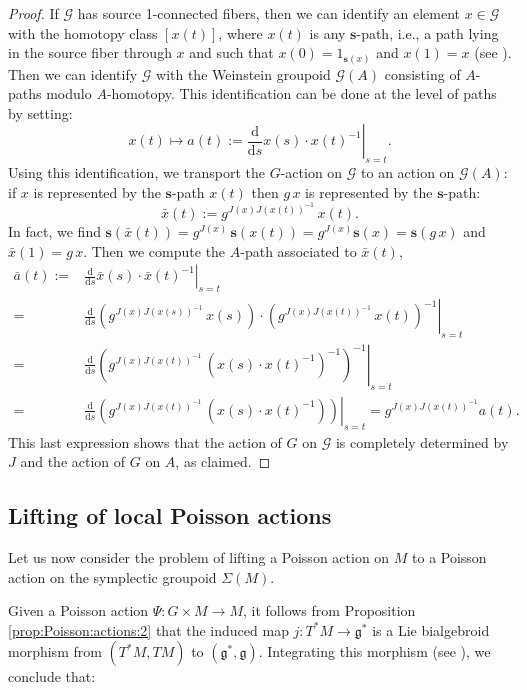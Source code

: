 \documentclass[a4paper,11pt]{amsart}
\theoremstyle{definition}
\theoremstyle{remark}
\begin{document}
\begin{proof}
If ${\mathcal{G}}$ has source 1-connected fibers, then we can identify an element
$x\in{\mathcal{G}}$ with the homotopy class $[x(t)]$, where $x(t)$ is any
${\mathbf{s}}$-path, i.e., a path lying in the source fiber through $x$ and
such that $x(0)=1_{{\mathbf{s}}(x)}$ and $x(1)=x$ (see \cite{CrFe}). Then we can identify ${\mathcal{G}}$
with the Weinstein groupoid ${\mathcal{G}}(A)$ consisting of $A$-paths modulo
$A$-homotopy. This identification can be done at the level of
paths by setting:
\[ x(t) \longmapsto a(t):=\left.\frac{\mathrm d}{{\mathrm d} s}x(s)\cdot x(t)^{-1}\right|_{s=t}.\]
Using this identification, we transport the $G$-action on
${\mathcal{G}}$ to an action on ${\mathcal{G}}(A)$: if $x$ is represented by the
${\mathbf{s}}$-path $x(t)$ then $g\,x$ is represented by the ${\mathbf{s}}$-path:
\[ \bar{x}(t):=g^{J(x)J(x(t))^{-1}}\,x(t). \]
In fact, we find ${\mathbf{s}}(\bar{x}(t))=g^{J(x)}\,{\mathbf{s}}(x(t))=g^{J(x)}{\mathbf{s}}(x)={\mathbf{s}}(g\,x)$ and $\bar{x}(1)=g\,x$. Then we
compute the $A$-path associated to $\bar{x}(t)$,
\begin{align*}
\bar{a}(t):=&\left.\frac{\mathrm d}{{\mathrm d} s}\bar{x}(s)\cdot \bar{x}(t)^{-1}\right|_{s=t}\\
=&\left.\frac{\mathrm d}{{\mathrm d} s} \left(g^{J(x)J(x(s))^{-1}}\,x(s)\right)\cdot \left(g^{J(x)J(x(t))^{-1}}\,x(t)\right)^{-1}\right|_{s=t}\\
=&\left.\frac{\mathrm d}{{\mathrm d} s} \left(g^{J(x)J(x(t))^{-1}}\,\left(x(s)\cdot x(t)^{-1}\right)^{-1}\right)^{-1}\right|_{s=t}\\
=&\left.\frac{\mathrm d}{{\mathrm d} s} \left(g^{J(x)J(x(t))^{-1}}\,
\left(x(s)\cdot
x(t)^{-1}\right)\right)\right|_{s=t}=g^{J(x)J(x(t))^{-1}}a(t).
\end{align*}
This last expression shows that the action of $G$ on ${\mathcal{G}}$ is
completely determined by $J$ and the action of $G$ on $A$, as claimed.
\end{proof}

\subsection{Lifting of local Poisson actions}                  \label{subsec:lifted:action:local}                             
Let us now consider the problem of lifting a Poisson action on $M$
to a Poisson action on the symplectic groupoid $\Sigma(M)$.

Given a Poisson action $\Psi:G\times M\to M$, it follows from
Proposition \ref{prop:Poisson:actions:2} that the induced map
$j:T^*M\to{\mathfrak{g}}^*$ is a Lie bialgebroid morphism from $(T^*M,TM)$ to
$({\mathfrak{g}}^*,{\mathfrak{g}})$. Integrating this morphism (see \cite[Theorem 5.5]{Xu0}),
we conclude that:
\end{document}
